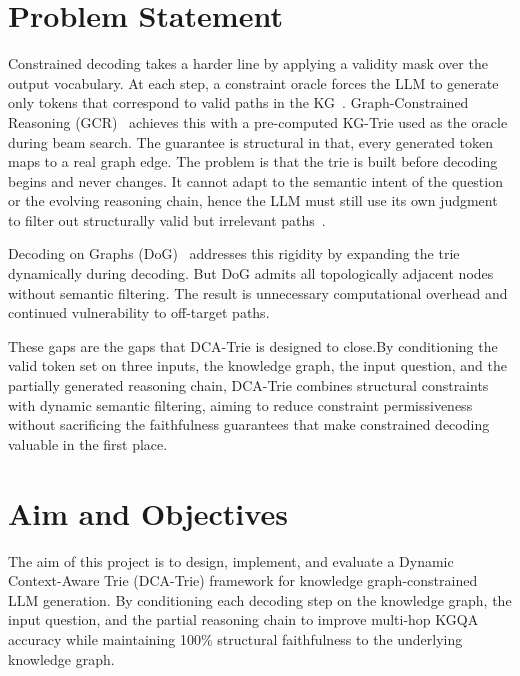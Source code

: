 \newpage

\section{Problem Statement}

Constrained decoding takes a harder line by applying a validity mask over the output vocabulary. At each step, a constraint oracle forces the LLM to generate only tokens that correspond to valid paths in the KG~\citep{willard2023outlines,geng2023grammarconstrained}. Graph-Constrained Reasoning (GCR)~\citep{luo2025-graph-constrained-reasoning} achieves this with a pre-computed KG-Trie used as the oracle during beam search. The guarantee is structural in that, every generated token maps to a real graph edge. The problem is that the trie is built before decoding begins and never changes. It cannot adapt to the semantic intent of the question or the evolving reasoning chain, hence the LLM must still use its own judgment to filter out structurally valid but irrelevant paths~\citep{li2024-decoding-on-graphs,luo2025-graph-constrained-reasoning}.

Decoding on Graphs (DoG)~\citep{li2024-decoding-on-graphs} addresses this rigidity by expanding the trie dynamically during decoding. But DoG admits all topologically adjacent nodes without semantic filtering. The result is unnecessary computational overhead and continued vulnerability to off-target paths.

These gaps are the gaps that DCA-Trie is designed to close.By conditioning the valid token set on three inputs, the knowledge graph, the input question, and the partially generated reasoning chain, DCA-Trie combines structural constraints with dynamic semantic filtering, aiming to reduce constraint permissiveness without sacrificing the faithfulness guarantees that make constrained decoding valuable in the first place.

\section{Aim and Objectives}

The aim of this project is to design, implement, and evaluate a Dynamic Context-Aware Trie (DCA-Trie) framework for knowledge graph-constrained LLM generation. By conditioning each decoding step on the knowledge graph, the input question, and the partial reasoning chain to improve multi-hop KGQA accuracy while maintaining 100\% structural faithfulness to the underlying knowledge graph.

